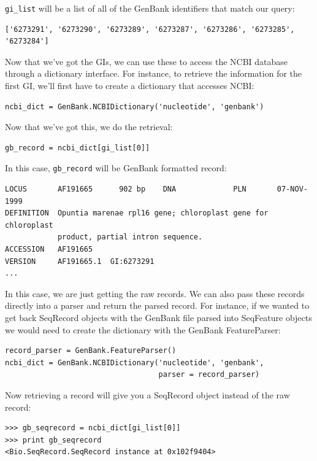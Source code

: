 \documentclass{report}
\begin{document}
\verb|gi_list| will be a list of all of the GenBank identifiers that match our query:

\begin{verbatim}
['6273291', '6273290', '6273289', '6273287', '6273286', '6273285', '6273284']
\end{verbatim}

Now that we've got the GIs, we can use these to access the NCBI database through a dictionary interface. For instance, to retrieve the information for the first GI, we'll first have to create a dictionary that accesses NCBI:

\begin{verbatim}
ncbi_dict = GenBank.NCBIDictionary('nucleotide', 'genbank')
\end{verbatim}

Now that we've got this, we do the retrieval:

\begin{verbatim}
gb_record = ncbi_dict[gi_list[0]]
\end{verbatim}

In this case, \verb|gb_record| will be GenBank formatted record:

\begin{verbatim}
LOCUS       AF191665      902 bp    DNA             PLN       07-NOV-1999
DEFINITION  Opuntia marenae rpl16 gene; chloroplast gene for chloroplast
            product, partial intron sequence.
ACCESSION   AF191665
VERSION     AF191665.1  GI:6273291
...
\end{verbatim}

In this case, we are just getting the raw records. We can also pass these records directly into a parser and return the parsed record. For instance, if we wanted to get back SeqRecord objects with the GenBank file parsed into SeqFeature objects we would need to create the dictionary with the GenBank FeatureParser:

\begin{verbatim}
record_parser = GenBank.FeatureParser()
ncbi_dict = GenBank.NCBIDictionary('nucleotide', 'genbank',
                                   parser = record_parser)
\end{verbatim}

Now retrieving a record will give you a SeqRecord object instead of the raw record:

\begin{verbatim}
>>> gb_seqrecord = ncbi_dict[gi_list[0]]
>>> print gb_seqrecord
<Bio.SeqRecord.SeqRecord instance at 0x102f9404>
\end{verbatim}
\end{document}
